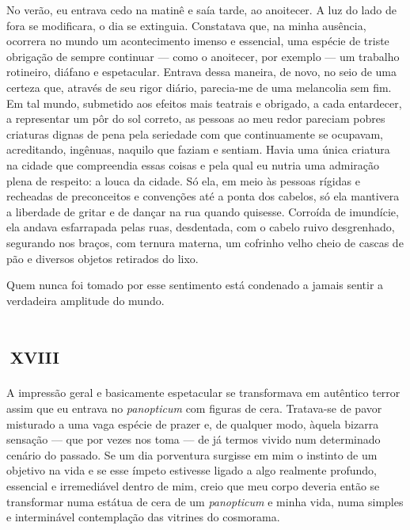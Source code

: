 \vspace*{-\baselineskip}

No verão, eu entrava cedo na matinê e saía tarde, ao anoitecer. A luz do lado de fora se modificara, o dia se extinguia. Constatava que, na minha ausência, ocorrera no mundo um acontecimento imenso e essencial, uma espécie de triste obrigação de sempre continuar --- como o anoitecer, por exemplo --- um trabalho rotineiro, diáfano e espetacular. Entrava dessa maneira, de novo, no seio de uma certeza que, através de seu rigor diário, parecia-me de uma melancolia sem fim. Em tal mundo, submetido aos efeitos mais teatrais e obrigado, a cada entardecer, a representar um pôr do sol correto, as pessoas ao meu redor pareciam pobres criaturas dignas de pena pela seriedade com que continuamente se ocupavam, acreditando, ingênuas, naquilo que faziam e sentiam. Havia uma única criatura na cidade que compreendia essas coisas e pela qual eu nutria uma admiração plena de respeito: a louca da cidade. Só ela, em meio às pessoas rígidas e recheadas de preconceitos e convenções até a ponta dos cabelos, só ela mantivera a liberdade de gritar e de dançar na rua quando quisesse. Corroída de imundície, ela andava esfarrapada pelas ruas, desdentada, com o cabelo ruivo desgrenhado, segurando nos braços, com ternura materna, um cofrinho velho cheio de cascas de pão e diversos objetos retirados do lixo.


Quem nunca foi tomado por esse sentimento está condenado a jamais sentir a verdadeira amplitude do mundo.


\chapter*{\small{}\,\Large\centering\textsc{xviii}\,\small{}}

A impressão geral e basicamente espetacular se transformava em autêntico terror assim que eu entrava no \textit{panopticum} com figuras de cera.  Tratava-se de pavor misturado a uma vaga espécie de prazer e, de qualquer modo, àquela bizarra sensação --- que por vezes nos toma --- de já termos vivido num determinado cenário do passado. Se um dia porventura surgisse em mim o instinto de um objetivo na vida e se esse ímpeto estivesse ligado a algo realmente profundo, essencial e irremediável dentro de mim, creio que meu corpo deveria então se transformar numa estátua de cera de um \textit{panopticum} e minha vida, numa simples e interminável contemplação das vitrines do cosmorama.


